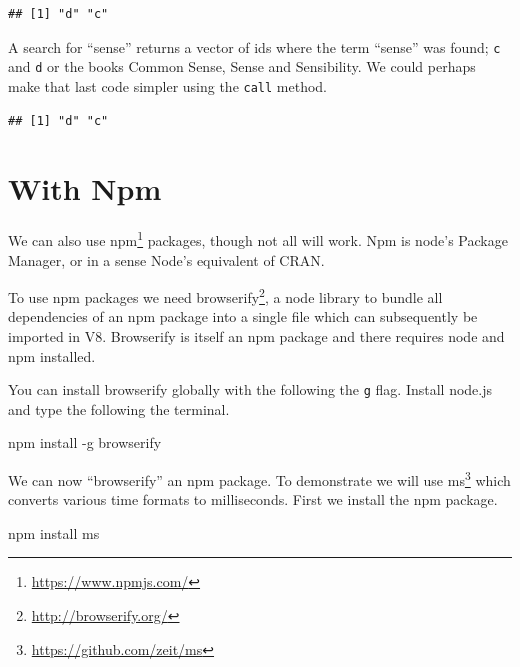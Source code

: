 \documentclass[
]{krantz}
\makeatletter
\newenvironment{Shaded}{\begin{snugshade}}{\end{snugshade}}
\newcommand{\ExtensionTok}[1]{#1}
\newcommand{\KeywordTok}[1]{\textcolor[rgb]{0.27,0.27,0.27}{\textbf{#1}}}
\newcommand{\NormalTok}[1]{#1}
\newcommand{\OperatorTok}[1]{\textcolor[rgb]{0.43,0.43,0.43}{\textbf{#1}}}
\newcommand{\StringTok}[1]{\textcolor[rgb]{0.5,0.5,0.5}{#1}}
\renewcommand{\href}[2]{#2\footnote{\url{#1}}}
\newenvironment{kframe}{%
\medskip{}
\setlength{\fboxsep}{.8em}
 \def\at@end@of@kframe{}%
 \ifinner\ifhmode%
  \def\at@end@of@kframe{\end{minipage}}%
  \begin{minipage}{\columnwidth}%
 \fi\fi%
 \def\FrameCommand##1{\hskip\@totalleftmargin \hskip-\fboxsep
 \colorbox{shadecolor}{##1}\hskip-\fboxsep
     \hskip-\linewidth \hskip-\@totalleftmargin \hskip\columnwidth}%
 \MakeFramed {\advance\hsize-\width
   \@totalleftmargin\z@ \linewidth\hsize
   \@setminipage}}%
 {\par\unskip\endMakeFramed%
 \at@end@of@kframe}
\renewenvironment{Shaded}{\begin{kframe}}{\end{kframe}}
\makeatother
\begin{document}
\begin{verbatim}
## [1] "d" "c"
\end{verbatim}

A search for ``sense'' returns a vector of ids where the term ``sense'' was found; \texttt{c} and \texttt{d} or the books Common Sense, Sense and Sensibility. We could perhaps make that last code simpler using the \texttt{call} method.

\begin{Shaded}
\end{Shaded}

\begin{verbatim}
## [1] "d" "c"
\end{verbatim}

\hypertarget{with-npm}{%
\section*{With Npm}\label{with-npm}}


We can also use \href{https://www.npmjs.com/}{npm} packages, though not all will work. Npm is node's Package Manager, or in a sense Node's equivalent of CRAN.

To use npm packages we need \href{http://browserify.org/}{browserify}, a node library to bundle all dependencies of an npm package into a single file which can subsequently be imported in V8. Browserify is itself an npm package and there requires node and npm installed.

You can install browserify globally with the following the \texttt{g} flag. Install node.js and type the following the terminal.

\begin{Shaded}
\begin{Highlighting}[]
\ExtensionTok{npm}\NormalTok{ install {-}g browserify}
\end{Highlighting}
\end{Shaded}

We can now ``browserify'' an npm package. To demonstrate we will use \href{https://github.com/zeit/ms}{ms} which converts various time formats to milliseconds. First we install the npm package.

\begin{Shaded}
\begin{Highlighting}[]
\ExtensionTok{npm}\NormalTok{ install ms}
\end{Highlighting}
\end{Shaded}
\end{document}
